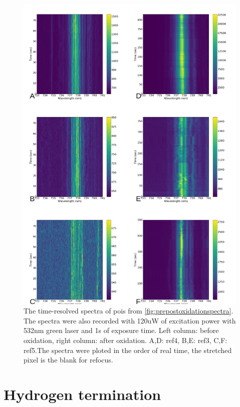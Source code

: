 \begin{figure}[h]
\centering
\includegraphics[width=1\linewidth]{Figures/pic/prepostoxidationtimeresolvespectra}
\caption{The time-resolved spectra of pois from \ref{fig:prepostoxidationspectra}. The spectra were also recorded with 120uW of excitation power with 532nm green laser and 1s of exposure time. Left column: before oxidation, right column: after oxidation. A,D: ref4, B,E: ref3, C,F: ref5.The spectra were ploted in the order of real time, the stretched pixel is the blank for refocus.}
\label{fig:prepostoxidationtimeresolvespectra}
\end{figure}


\section{Hydrogen termination}


